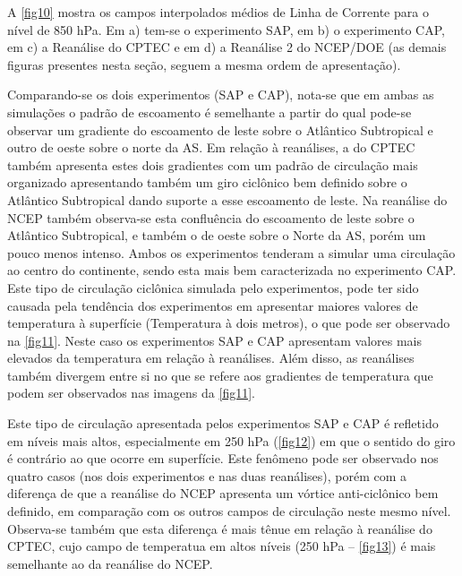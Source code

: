 A \autoref{fig10} mostra os campos interpolados médios de Linha de Corrente para o nível de 850 hPa. Em a) tem-se o experimento SAP, em b) o experimento CAP, em c) a Reanálise do CPTEC e em d) a Reanálise 2 do NCEP/DOE (as demais figuras presentes nesta seção, seguem a mesma ordem de apresentação).

Comparando-se os dois experimentos (SAP e CAP), nota-se que em ambas as simulações o padrão de escoamento é semelhante a partir do qual pode-se observar um gradiente do escoamento de leste sobre o Atlântico Subtropical e outro de oeste sobre o norte da AS. Em relação à reanálises, a do CPTEC também apresenta estes dois gradientes com um padrão de circulação mais organizado apresentando também um giro ciclônico bem definido sobre o Atlântico Subtropical dando suporte a esse escoamento de leste. Na reanálise do NCEP também observa-se esta confluência do escoamento de leste sobre o Atlântico Subtropical, e também o de oeste sobre o Norte da AS, porém um pouco menos intenso. Ambos os experimentos tenderam a simular uma circulação ao centro do continente, sendo esta mais bem caracterizada no experimento CAP. Este tipo de circulação ciclônica simulada pelo experimentos, pode ter sido causada pela tendência dos experimentos em apresentar maiores valores de temperatura à superfície (Temperatura à dois metros), o que pode ser observado na \autoref{fig11}. Neste caso os experimentos SAP e CAP apresentam valores mais elevados da temperatura em relação à reanálises. Além disso, as reanálises também divergem entre si no que se refere aos gradientes de temperatura que podem ser observados nas imagens da \autoref{fig11}. 

Este tipo de circulação apresentada pelos experimentos SAP e CAP é refletido em níveis mais altos, especialmente em 250 hPa (\autoref{fig12}) em que o sentido do giro é contrário ao que ocorre em superfície. Este fenômeno pode ser observado nos quatro casos (nos dois experimentos e nas duas reanálises), porém com a diferença de que a reanálise do NCEP apresenta um vórtice anti-ciclônico bem definido, em comparação com os outros campos de circulação neste mesmo nível. Observa-se também que esta diferença é mais tênue em relação à reanálise do CPTEC, cujo campo de temperatua em altos níveis (250 hPa – \autoref{fig13}) é mais semelhante ao da reanálise do NCEP.

